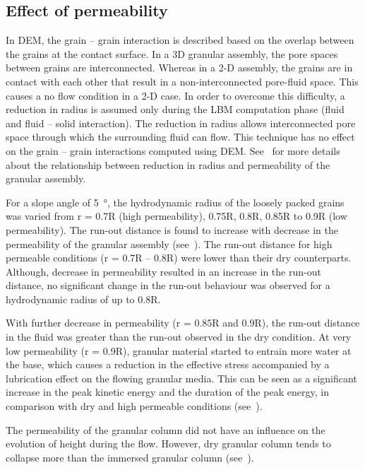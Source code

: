 \subsection{Effect of permeability}

In DEM, the grain -- grain interaction is described based on the overlap 
between the grains at the contact surface. In a 3D granular assembly, the pore 
spaces between grains are interconnected. Whereas in a 2-D assembly, the grains 
are in contact with each other that result in a non-interconnected pore-fluid 
space. This causes a no flow condition in a 2-D case. In order to overcome this 
difficulty, a reduction in radius is assumed only during the LBM computation 
phase (fluid and fluid -- solid interaction). The reduction in radius allows 
interconnected pore space through which the surrounding fluid can flow. This 
technique has no effect on the grain -- grain interactions computed using DEM. 
See~\citet{Kumar2012} for more details about the relationship between reduction 
in radius and permeability of the granular assembly.


For a slope angle of \SI{5}{\degree}, the hydrodynamic radius of the loosely 
packed grains was varied from r = 0.7R (high permeability), 0.75R, 0.8R, 0.85R 
to 0.9R (low permeability). The run-out distance is found to increase with 
decrease in the permeability of the granular assembly (see~). 
The run-out distance for high permeable conditions (r = 0.7R -- 0.8R) were 
lower than their dry counterparts. Although, decrease in permeability resulted 
in an increase in the run-out distance, no significant change in the run-out 
behaviour was observed for a hydrodynamic radius of up to 0.8R.

With further decrease in permeability (r = 0.85R and 0.9R), the run-out 
distance in the fluid was greater than the run-out observed in the dry 
condition. At very low permeability (r = 0.9R), granular material started to 
entrain more water at the base, which causes a reduction in the effective 
stress accompanied by a lubrication effect on the flowing granular media. This 
can be seen as a significant increase in the peak kinetic energy and the 
duration of the peak energy, in comparison with dry and high permeable 
conditions (see~).

The permeability of the granular column did not have an influence on the evolution of height during the flow. However, dry granular column tends to collapse more than the immersed granular column (see~).

